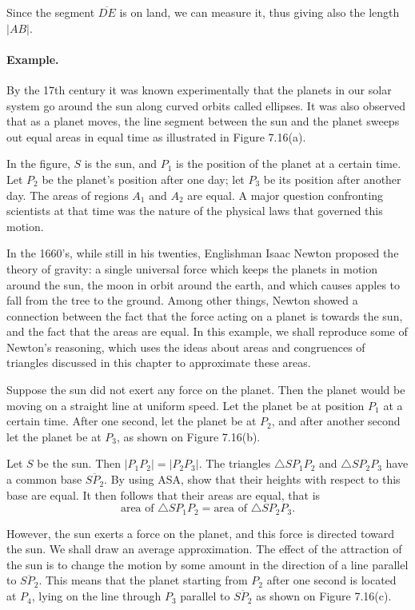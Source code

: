 \documentclass[12pt]{book} %
\begin{document}
Since the segment $\overline{DE}$ is on land, we can measure it, thus giving also the length $|AB|$.

\paragraph{Example.}
By the 17th century it was known experimentally that the planets in our solar system go around the sun along curved orbits called ellipses. It was also observed that as a planet moves, the line segment between the sun and the planet sweeps out equal areas in equal time as illustrated in Figure 7.16(a).


In the figure, $S$ is the sun, and $P_1$ is the position of the planet at a certain time. Let $P_2$ be the planet's position after one day; let $P_3$ be its position after another day. The areas of regions $A_1$ and $A_2$ are equal. A major question confronting scientists at that time was the nature of the physical laws that governed this motion.

In the 1660's, while still in his twenties, Englishman Isaac Newton proposed the theory of gravity: a single universal force which keeps the planets in motion around the sun, the moon in orbit around the earth, and which causes apples to fall from the tree to the ground. Among other things, Newton showed a connection between the fact that the force acting on a planet is towards the sun, and the fact that the areas are equal. In this example, we shall reproduce some of Newton's reasoning, which uses the ideas about areas and congruences of triangles discussed in this chapter to approximate these areas.

Suppose the sun did not exert any force on the planet. Then the planet would be moving on a straight line at uniform speed. Let the planet be at position $P_1$ at a certain time. After one second, let the planet be at $P_2$, and after another second let the planet be at $P_3$, as shown on Figure 7.16(b).


Let $S$ be the sun. Then $|P_1P_2|=|P_2P_3|$. The triangles $\triangle SP_1P_2$ and $\triangle SP_2P_3$ have a common base $\overline{SP_2}$. By using ASA, show that their heights with respect to this base are equal. It then follows that their areas are equal, that is
\[
\text{area of }\triangle SP_1P_2=\text{area of }\triangle SP_2P_3.
\]

However, the sun exerts a force on the planet, and this force is directed toward the sun. We shall draw an average approximation. The effect of the attraction of the sun is to change the motion by some amount in the direction of a line parallel to $\overline{SP_2}$. This means that the planet starting from $P_2$ after one second is located at $P_4$, lying on the line through $P_3$ parallel to $\overline{SP_2}$ as shown on Figure 7.16(c).
\end{document}

